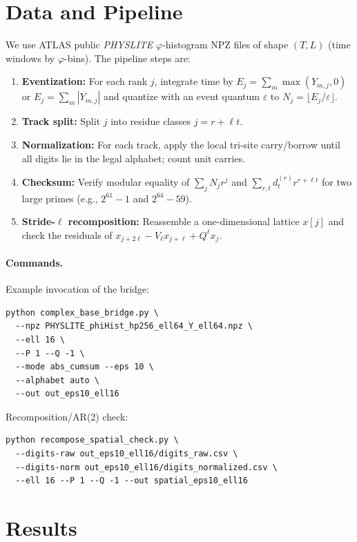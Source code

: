 \documentclass[11pt]{article}
\begin{document}
\section{Data and Pipeline}
\label{sec:data}

We use ATLAS public \emph{PHYSLITE} $\varphi$-histogram NPZ files of shape $(T,L)$ (time windows by
$\varphi$-bins). The pipeline steps are:

\begin{enumerate}
\item \textbf{Eventization:} For each rank $j$, integrate time by $E_j=\sum_m\max(Y_{m,j},0)$
or $E_j=\sum_m|Y_{m,j}|$ and quantize with an event quantum $\varepsilon$ to $N_j=\lfloor E_j/\varepsilon\rfloor$.
\item \textbf{Track split:} Split $j$ into residue classes $j=r+\ell t$.
\item \textbf{Normalization:} For each track, apply the local tri-site carry/borrow until all digits
lie in the legal alphabet; count unit carries.
\item \textbf{Checksum:} Verify modular equality of $\sum_j N_j r^j$ and $\sum_{r,t} d^{(r)}_t r^{r+\ell t}$
for two large primes (e.g., $2^{61}{-}1$ and $2^{64}{-}59$).
\item \textbf{Stride-$\ell$ recomposition:} Reassemble a one-dimensional lattice $x[j]$ and check
the residuals of $x_{j+2\ell}-V_\ell x_{j+\ell}+Q^\ell x_j$.
\end{enumerate}

\paragraph{Commands.} Example invocation of the bridge:
\begin{verbatim}
python complex_base_bridge.py \
  --npz PHYSLITE_phiHist_hp256_ell64_Y_ell64.npz \
  --ell 16 \
  --P 1 --Q -1 \
  --mode abs_cumsum --eps 10 \
  --alphabet auto \
  --out out_eps10_ell16
\end{verbatim}
Recomposition/AR(2) check:
\begin{verbatim}
python recompose_spatial_check.py \
  --digits-raw out_eps10_ell16/digits_raw.csv \
  --digits-norm out_eps10_ell16/digits_normalized.csv \
  --ell 16 --P 1 --Q -1 --out spatial_eps10_ell16
\end{verbatim}

\section{Results}
\label{sec:results}
\end{document}
